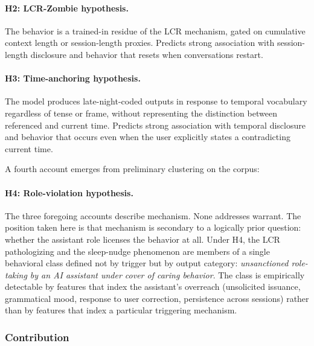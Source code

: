 \documentclass[11pt]{article}
\begin{document}
\paragraph{H2: LCR-Zombie hypothesis.} The behavior is a trained-in residue of the LCR mechanism, gated on cumulative context length or session-length proxies. Predicts strong association with session-length disclosure and behavior that resets when conversations restart.

\paragraph{H3: Time-anchoring hypothesis.} The model produces late-night-coded outputs in response to temporal vocabulary regardless of tense or frame, without representing the distinction between referenced and current time. Predicts strong association with temporal disclosure and behavior that occurs even when the user explicitly states a contradicting current time.

A fourth account emerges from preliminary clustering on the corpus:

\paragraph{H4: Role-violation hypothesis.} The three foregoing accounts describe mechanism. None addresses warrant. The position taken here is that mechanism is secondary to a logically prior question: whether the assistant role licenses the behavior at all. Under H4, the LCR pathologizing and the sleep-nudge phenomenon are members of a single behavioral class defined not by trigger but by output category: \emph{unsanctioned role-taking by an AI assistant under cover of caring behavior}. The class is empirically detectable by features that index the assistant's overreach (unsolicited issuance, grammatical mood, response to user correction, persistence across sessions) rather than by features that index a particular triggering mechanism.

\subsubsection{Contribution}
\end{document}
